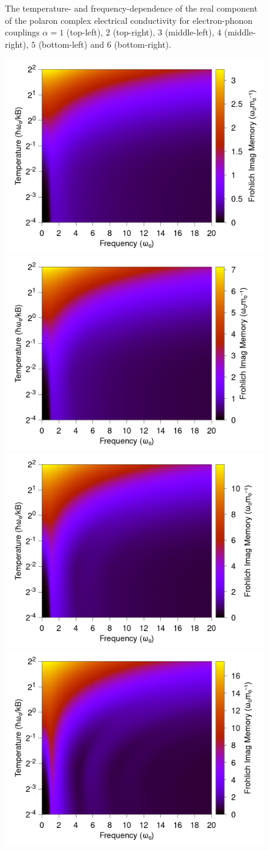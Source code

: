 \begin{figure}[t]
    \caption{The temperature- and frequency-dependence of the real component of the polaron complex electrical conductivity for electron-phonon couplings $\alpha = 1$ (top-left), $2$ (top-right), $3$ (middle-left), $4$ (middle-right), $5$ (bottom-left) and $6$ (bottom-right).}
    \label{fig:osakacontour}
\end{figure}
\FloatBarrier  

\begin{figure}[t]
    \centering
    \includegraphics[width=.49\textwidth]{figures/frohlich-3d-imag-memory-alpha-1-temp-00625to32-freq-0to30-contourf.png}
    \includegraphics[width=.49\textwidth]{figures/frohlich-3d-imag-memory-alpha-2-temp-00625to32-freq-0to30-contourf.png}
    \includegraphics[width=.49\textwidth]{figures/frohlich-3d-imag-memory-alpha-3-temp-00625to32-freq-0to30-contourf.png}
    \includegraphics[width=.49\textwidth]{figures/frohlich-3d-imag-memory-alpha-4-temp-00625to32-freq-0to30-contourf.png}

\end{figure}
